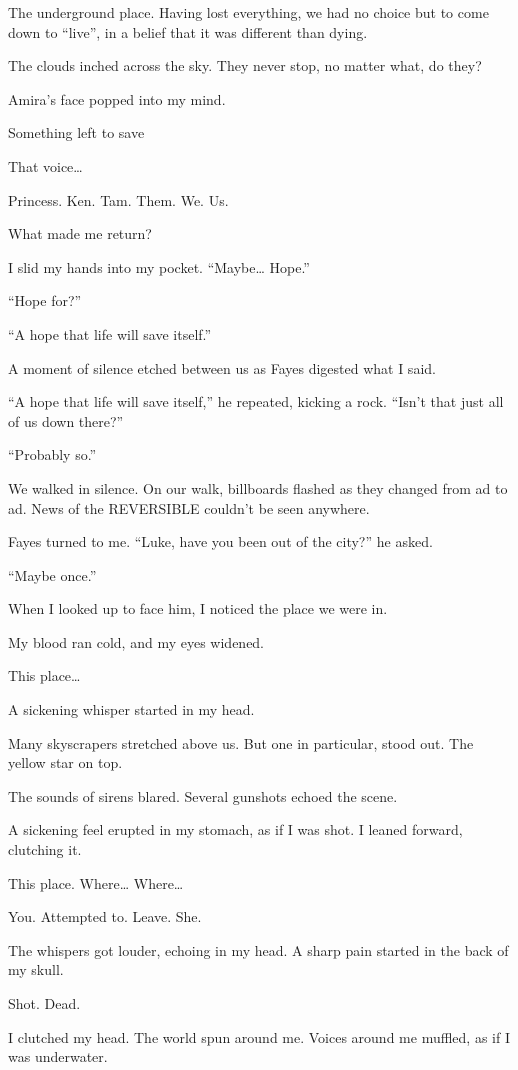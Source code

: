 The underground place. Having lost everything, we had no choice but to come down to “live”, in a belief that it was different than dying.

The clouds inched across the sky. They never stop, no matter what, do they?

Amira’s face popped into my mind. 

Something left to save

That voice…

Princess. Ken. Tam. Them. We. Us.

What made me return?

I slid my hands into my pocket. “Maybe… Hope.”

“Hope for?”

“A hope that life will save itself.”

A moment of silence etched between us as Fayes digested what I said.

“A hope that life will save itself,” he repeated, kicking a rock. “Isn’t that just all of us down there?”

“Probably so.”

We walked in silence. On our walk, billboards flashed as they changed from ad to ad. News of the REVERSIBLE couldn’t be seen anywhere.

Fayes turned to me. “Luke, have you been out of the city?” he asked.

“Maybe once.”

When I looked up to face him, I noticed the place we were in.

My blood ran cold, and my eyes widened.

This place…

A sickening whisper started in my head.

Many skyscrapers stretched above us. But one in particular, stood out. The yellow star on top.

The sounds of sirens blared. Several gunshots echoed the scene.

A sickening feel erupted in my stomach, as if I was shot. I leaned forward, clutching it.

This place. Where… Where… 

You. Attempted to. Leave. She.

The whispers got louder, echoing in my head. A sharp pain started in the back of my skull.

Shot. Dead.

I clutched my head. The world spun around me. Voices around me muffled, as if I was underwater.

